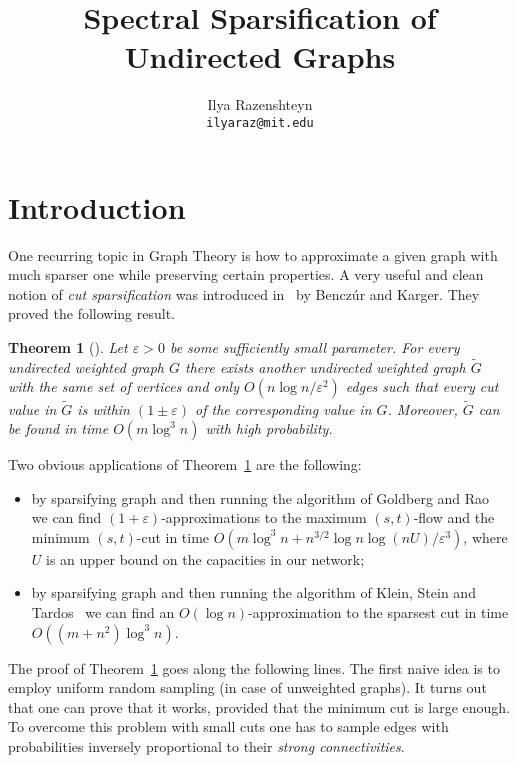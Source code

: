 \documentclass[12pt]{article}
\newcommand{\eps}{\varepsilon}
\newtheorem{theorem}{Theorem}
\begin{document}
    \title{Spectral Sparsification of Undirected Graphs}
    \author{Ilya Razenshteyn\\\texttt{ilyaraz@mit.edu}}
    \maketitle

    \section{Introduction}

    One recurring topic in Graph Theory is how to approximate a given graph with much sparser one while preserving certain
    properties. A very useful and clean
    notion of \emph{cut sparsification} was introduced in~\cite{BK96} by Bencz\'{u}r and Karger.
    They proved the following result.

    \begin{theorem}[\cite{BK96}]
        \label{benczur_karger}
        Let $\eps > 0$ be some sufficiently small parameter.
        For every undirected weighted graph $G$ there exists another undirected weighted graph $\tilde{G}$ with the
        same set of vertices and only $O(n \log n / \eps^2)$ edges such that every cut value in $\tilde{G}$
        is within $(1 \pm \eps)$ of the corresponding value in $G$. Moreover, $\tilde{G}$ can be found in time
        $O(m \log^3 n)$ with high probability.
    \end{theorem}

    Two obvious applications of Theorem~\ref{benczur_karger} are the following:
    \begin{itemize}
        \item by sparsifying graph and then running the algorithm of Goldberg and Rao~\cite{GR98} we can find
        $(1 + \eps)$-approximations to the maximum $(s, t)$-flow and the minimum $(s, t)$-cut in time
        $O(m \log^3 n + n^{3/2} \log n \log(nU) / \eps^3)$, where $U$ is an upper bound on the capacities in our network;
        \item by sparsifying graph and then running the algorithm of Klein, Stein and Tardos~\cite{KST90} we can find
        an $O(\log n)$-approximation to the sparsest cut in time $O((m + n^2) \log^3 n)$.
    \end{itemize}

    The proof of Theorem~\ref{benczur_karger} goes along the following lines. The first naive idea is to employ uniform
    random sampling (in case of unweighted graphs).
    It turns out that one can prove that it works, provided that the minimum cut is large enough.
    To overcome this problem with small cuts one has to sample edges with probabilities inversely proportional to their
    \emph{strong connectivities}.
\end{document}

